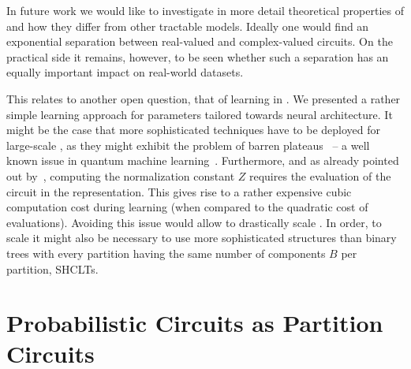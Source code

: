 In future work we would like to investigate in more detail theoretical properties of \pocs and how they differ from other tractable models. Ideally one would find an exponential separation between real-valued and complex-valued circuits. On the practical side it remains, however, to be seen whether such a separation has an equally important impact on real-world datasets.

This relates to another open question,  that of learning in \pocs. We presented a rather simple learning approach for parameters tailored towards neural architecture. It might be the case that more sophisticated techniques have to be deployed for large-scale \pocs, as they might exhibit the problem of barren plateaus~\citep{ragone2023unified} -- a well known issue in quantum machine learning~\citep{biamonte2017quantum,huggins2019towards}.
Furthermore, and as already pointed out by~\citet{loconte2024subtractive}, computing the normalization constant $Z$ requires the evaluation of the circuit in the \poc representation. This gives rise to a rather expensive cubic computation cost during learning (when compared to the quadratic cost of \pvc evaluations). Avoiding this issue would allow to drastically scale \pvcs. In order, to scale \pvcs it might also be necessary to use more sophisticated structures than binary trees with every partition having the same number of components $B$ per partition, \cf SHCLTs.



\clearpage















\newpage

\setcounter{equation}{0}
\renewcommand{\theequation}{A\arabic{equation}}

\appendix








\section{Probabilistic Circuits as Partition Circuits}
\label{sec:lpc}


